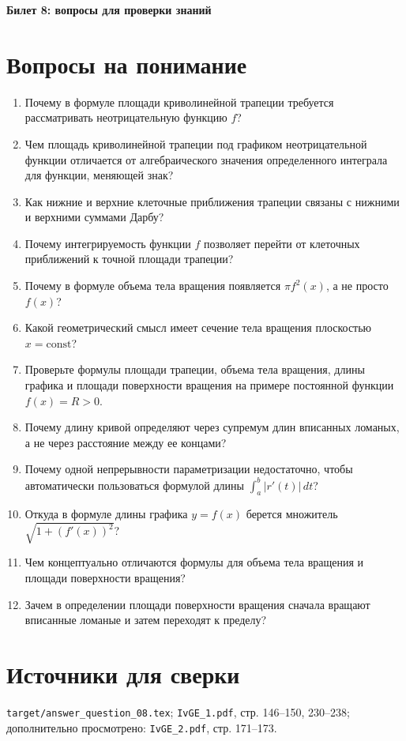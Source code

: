\documentclass[12pt,a4paper]{article}
\begin{document}
\begin{center}
{\Large\bfseries Билет 8: вопросы для проверки знаний}
\end{center}

\noindent{}

\section*{Вопросы на понимание}

\begin{enumerate}
\item Почему в формуле площади криволинейной трапеции требуется рассматривать неотрицательную функцию \(f\)?
\item Чем площадь криволинейной трапеции под графиком неотрицательной функции отличается от алгебраического значения определенного интеграла для функции, меняющей знак?
\item Как нижние и верхние клеточные приближения трапеции связаны с нижними и верхними суммами Дарбу?
\item Почему интегрируемость функции \(f\) позволяет перейти от клеточных приближений к точной площади трапеции?
\item Почему в формуле объема тела вращения появляется \(\pi f^2(x)\), а не просто \(f(x)\)?
\item Какой геометрический смысл имеет сечение тела вращения плоскостью \(x=\mathrm{const}\)?
\item Проверьте формулы площади трапеции, объема тела вращения, длины графика и площади поверхности вращения на примере постоянной функции \(f(x)=R>0\).
\item Почему длину кривой определяют через супремум длин вписанных ломаных, а не через расстояние между ее концами?
\item Почему одной непрерывности параметризации недостаточно, чтобы автоматически пользоваться формулой длины \(\int_a^b |r'(t)|\,dt\)?
\item Откуда в формуле длины графика \(y=f(x)\) берется множитель \(\sqrt{1+(f'(x))^2}\)?
\item Чем концептуально отличаются формулы для объема тела вращения и площади поверхности вращения?
\item Зачем в определении площади поверхности вращения сначала вращают вписанные ломаные и затем переходят к пределу?
\end{enumerate}

\section*{Источники для сверки}

\texttt{target/answer\_question\_08.tex};
\texttt{IvGE\_1.pdf}, стр. 146--150, 230--238;
дополнительно просмотрено: \texttt{IvGE\_2.pdf}, стр. 171--173.
\end{document}
